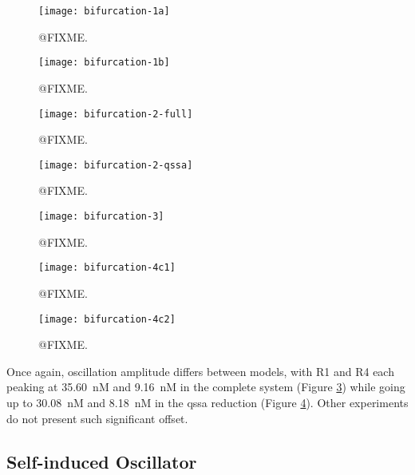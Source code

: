     \begin{figure}[!htbp]
      \centering
      \texttt{[image: bifurcation-1a]}
      \caption{@FIXME.}
      \label{fig.bifurcation-1a}
    \end{figure}

    \begin{figure}[!htbp]
      \centering
      \texttt{[image: bifurcation-1b]}
      \caption{@FIXME.}
      \label{fig.bifurcation-1b}
    \end{figure}

    \begin{figure}[!htbp]
      \centering
      \texttt{[image: bifurcation-2-full]}
      \caption{@FIXME.}
      \label{fig.bifurcation-2-full}
    \end{figure}

    \begin{figure}[!htbp]
      \centering
      \texttt{[image: bifurcation-2-qssa]}
      \caption{@FIXME.}
      \label{fig.bifurcation-2-qssa}
    \end{figure}

    \begin{figure}[!htbp]
      \centering
      \texttt{[image: bifurcation-3]}
      \caption{@FIXME.}
      \label{fig.bifurcation-3}
    \end{figure}

    \begin{figure}[!htbp]
      \centering
      \texttt{[image: bifurcation-4c1]}
      \caption{@FIXME.}
      \label{fig.bifurcation-4c1}
    \end{figure}

    \begin{figure}[!htbp]
      \centering
      \texttt{[image: bifurcation-4c2]}
      \caption{@FIXME.}
      \label{fig.bifurcation-4c2}
    \end{figure}

    Once again, oscillation amplitude differs between models, with R1 and R4 each peaking at \SI{35.60}{\nano M} and \SI{9.16}{\nano M} in the complete system (Figure \ref{fig.bifurcation-2-full}) while going up to \SI{30.08}{\nano M} and \SI{8.18}{\nano M} in the \ac{qssa} reduction (Figure \ref{fig.bifurcation-2-qssa}).
    Other experiments do not present such significant offset.


  \subsection{Self-induced Oscillator}

